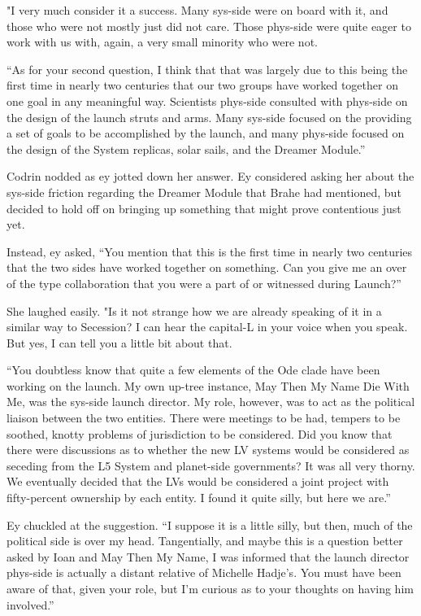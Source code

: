"I very much consider it a success. Many sys-side were on board with it, and those who were not mostly just did not care. Those phys-side were quite eager to work with us with, again, a very small minority who were not.

``As for your second question, I think that that was largely due to this being the first time in nearly two centuries that our two groups have worked together on one goal in any meaningful way. Scientists phys-side consulted with phys-side on the design of the launch struts and arms. Many sys-side focused on the providing a set of goals to be accomplished by the launch, and many phys-side focused on the design of the System replicas, solar sails, and the Dreamer Module.''

Codrin nodded as ey jotted down her answer. Ey considered asking her about the sys-side friction regarding the Dreamer Module that Brahe had mentioned, but decided to hold off on bringing up something that might prove contentious just yet.

Instead, ey asked, ``You mention that this is the first time in nearly two centuries that the two sides have worked together on something. Can you give me an over of the type collaboration that you were a part of or witnessed during Launch?''

She laughed easily. "Is it not strange how we are already speaking of it in a similar way to Secession? I can hear the capital-L in your voice when you speak. But yes, I can tell you a little bit about that.

``You doubtless know that quite a few elements of the Ode clade have been working on the launch. My own up-tree instance, May Then My Name Die With Me, was the sys-side launch director. My role, however, was to act as the political liaison between the two entities. There were meetings to be had, tempers to be soothed, knotty problems of jurisdiction to be considered. Did you know that there were discussions as to whether the new LV systems would be considered as seceding from the L5 System and planet-side governments? It was all very thorny. We eventually decided that the LVs would be considered a joint project with fifty-percent ownership by each entity. I found it quite silly, but here we are.''

Ey chuckled at the suggestion. ``I suppose it is a little silly, but then, much of the political side is over my head. Tangentially, and maybe this is a question better asked by Ioan and May Then My Name, I was informed that the launch director phys-side is actually a distant relative of Michelle Hadje's. You must have been aware of that, given your role, but I'm curious as to your thoughts on having him involved.''

